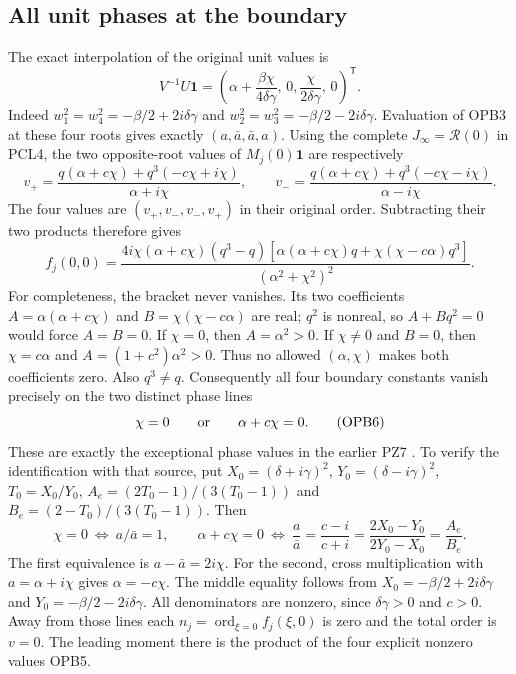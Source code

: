 \documentclass[11pt]{article}
\begin{document}
\subsection{All unit phases at the boundary}
The exact interpolation of the original unit values is
\[
 V^{-1}U\boldsymbol1=
 \left(\alpha+\frac{\beta\chi}{4\delta\gamma},\,0,
              \frac{\chi}{2\delta\gamma},\,0\right)^{\mathsf T}.
 \tag{OPB3}
\]
Indeed $w_1^2=w_4^2=-\beta/2+2i\delta\gamma$ and
$w_2^2=w_3^2=-\beta/2-2i\delta\gamma$. Evaluation of OPB3 at
these four roots gives exactly $(a,\bar a,\bar a,a)$.
Using the complete $J_\infty=\mathcal R(0)$ in PCL4, the two
opposite-root values of $M_j(0)\boldsymbol1$ are respectively
\[
 v_+=\frac{q(\alpha+c\chi)+q^3(-c\chi+i\chi)}{\alpha+i\chi},
 \qquad
 v_-=\frac{q(\alpha+c\chi)+q^3(-c\chi-i\chi)}{\alpha-i\chi}.
 \tag{OPB4}
\]
The four values are $(v_+,v_-,v_-,v_+)$ in their original order.
Subtracting their two products therefore gives
\[
 f_j(0,0)=
 \frac{4i\chi(\alpha+c\chi)(q^3-q)
 [\alpha(\alpha+c\chi)q+\chi(\chi-c\alpha)q^3]}
 {(\alpha^2+\chi^2)^2}.
 \tag{OPB5}
\]
For completeness, the bracket never vanishes. Its two coefficients
$A=\alpha(\alpha+c\chi)$ and $B=\chi(\chi-c\alpha)$ are real;
$q^2$ is nonreal, so $A+Bq^2=0$ would force $A=B=0$.
If $\chi=0$, then $A=\alpha^2>0$. If $\chi\ne0$ and $B=0$,
then $\chi=c\alpha$ and $A=(1+c^2)\alpha^2>0$.
Thus no allowed $(\alpha,\chi)$ makes both coefficients zero.
Also $q^3\ne q$. Consequently all four boundary constants vanish
precisely on the two distinct phase lines
\[
             \chi=0\qquad\hbox{or}\qquad\alpha+c\chi=0.
 \tag{OPB6}
\]
These are exactly the exceptional phase values in the earlier PZ7
\cite{PeriodZeroOriginal}. To verify the identification with that source,
put $X_0=(\delta+i\gamma)^2$, $Y_0=(\delta-i\gamma)^2$,
$T_0=X_0/Y_0$, $A_e=(2T_0-1)/(3(T_0-1))$ and
$B_e=(2-T_0)/(3(T_0-1))$. Then
\[
 \chi=0\ \Longleftrightarrow\ a/\bar a=1,\qquad
 \alpha+c\chi=0\ \Longleftrightarrow\
 \frac a{\bar a}=\frac{c-i}{c+i}
       =\frac{2X_0-Y_0}{2Y_0-X_0}=\frac{A_e}{B_e}.
 \tag{OPB6a}
\]
The first equivalence is $a-\bar a=2i\chi$.
For the second, cross multiplication with $a=\alpha+i\chi$ gives
$\alpha=-c\chi$. The middle equality follows from
$X_0=-\beta/2+2i\delta\gamma$ and
$Y_0=-\beta/2-2i\delta\gamma$. All denominators are nonzero,
since $\delta\gamma>0$ and $c>0$.
Away from those lines each $n_j=\operatorname{ord}_{\xi=0}f_j(\xi,0)$
is zero and the total order is $v=0$. The leading moment there is
the product of the four explicit nonzero values OPB5.
\end{document}
